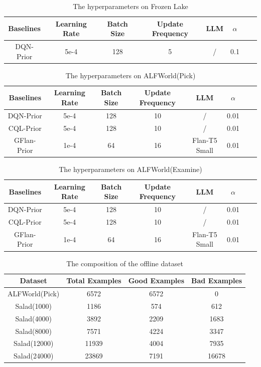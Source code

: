 \begin{table}[]
    \caption{The hyperparameters on Frozen Lake}
    \centering
    \begin{tabular}{cccccccc}
    \hline
    Baselines & Learning Rate  & Batch Size & Update Frequency& LLM &$\alpha$\\
    \hline
        DQN-Prior & 5e-4& 128&5&/ &0.1  \\
    \hline
        \end{tabular}
    \label{tab:lake}
\end{table}
\begin{table}[]
    \caption{The hyperparameters on ALFWorld(Pick)}
    \centering
    \begin{tabular}{cccccccc}
    \hline
    Baselines & Learning Rate  & Batch Size & Update Frequency& LLM &$\alpha$\\
    \hline
        DQN-Prior & 5e-4&128&10&/ &0.01  \\
        CQL-Prior & 5e-4&128&10  &/ &0.01 \\
        GFlan-Prior  & 1e-4&64&16&Flan-T5 Small&0.01  \\
    \hline
        \end{tabular}
    \label{tab:pick}
\end{table}
\begin{table}[]
    \caption{The hyperparameters on ALFWorld(Examine)}
    \centering
    \begin{tabular}{cccccccc}
    \hline
    Baselines & Learning Rate  & Batch Size & Update Frequency& LLM &$\alpha$\\
    \hline
        DQN-Prior & 5e-4&128&10&/ &0.01  \\
        CQL-Prior & 5e-4&128&10  &/ &0.01 \\
        GFlan-Prior  & 1e-4&64&16&Flan-T5 Small&0.01  \\
    \hline
        \end{tabular}
    \label{tab:exam}
\end{table}
\begin{table}[]
    \centering
    \begin{tabular}{c|ccc}
    \hline
         Dataset & Total Examples & Good Examples & Bad Examples  \\
         \hline
         ALFWorld(Pick)&6572&6572&0 \\
         Salad(1000)&1186&574&612\\
         Salad(4000)&3892&2209&1683\\
         Salad(8000) &7571&4224&3347\\
         Salad(12000)&11939&4004&7935\\
           Salad(24000)&23869&7191&16678\\
\hline
    \end{tabular}
    \caption{The composition of the offline dataset}
    \label{tab:offline_data}
\end{table}
